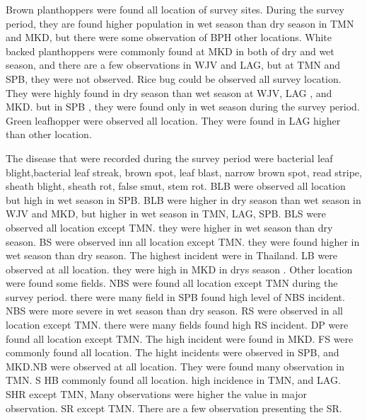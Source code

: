 Brown planthoppers were  found all location of survey sites. During the survey period, they are found higher population in wet season than dry season in TMN and MKD, but  there were some observation of BPH other locations. White backed planthoppers were commonly found at MKD in both of dry and wet season, and there are a few observations in WJV and LAG, but at TMN and SPB, they were not observed. Rice bug could be observed all survey location. They were highly found in dry season than wet season at WJV, LAG , and MKD. but in SPB , they were found only in wet season during the survey period.  Green leafhopper were observed all location. They were found in LAG higher than other location.

The disease that were recorded during the survey period were bacterial leaf blight,bacterial leaf streak, brown spot, leaf blast, narrow brown spot, read stripe, sheath blight, sheath rot, false smut, stem rot. BLB were observed all location but high in wet season in SPB.  BLB were higher in dry season than wet season in WJV and MKD, but higher in  wet season in TMN, LAG, SPB. BLS were observed  all location except TMN. they were higher in wet season than dry season. BS were observed inn all location except TMN. they were found higher in wet season than dry season. The highest incident were in Thailand. LB were observed at all location. they were high in MKD in drys season . Other location were found some fields. NBS were found all location except TMN during the survey period. there were many field in SPB found high level of NBS incident. NBS were more severe in wet season than dry season. RS were observed in all location except TMN. there were many fields found high RS incident. DP were found all location except TMN. The high incident were found in MKD. FS were commonly found all location. The hight incidents were observed in SPB, and MKD.NB were observed  at all location. They were found many observation in TMN. S HB commonly found all location.  high incidence in TMN, and LAG.  SHR except TMN, Many observations were higher the value in major observation. SR except TMN. There are a few observation presenting the SR. 


